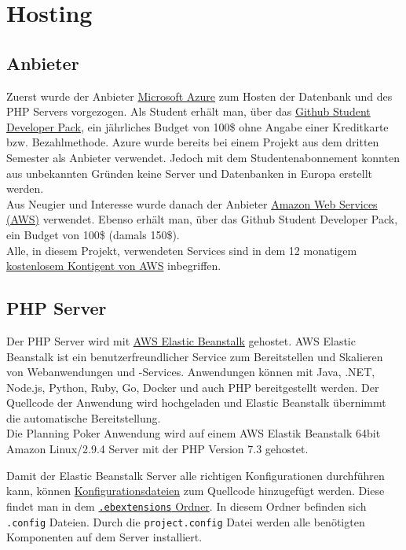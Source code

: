 \chapter{Hosting}\label{ch:hosting}

\section{Anbieter}
Zuerst wurde der Anbieter \href{https://azure.microsoft.com/de-de/}{Microsoft Azure} zum Hosten der Datenbank und des PHP Servers vorgezogen. Als Student erhält man, über das \href{https://education.github.com/pack}{Github Student Developer Pack}, ein jährliches Budget von 100\$ ohne Angabe einer Kreditkarte bzw. Bezahlmethode. Azure wurde bereits bei einem Projekt aus dem dritten Semester als Anbieter verwendet. Jedoch mit dem Studentenabonnement konnten aus unbekannten Gründen keine Server und Datenbanken in Europa erstellt werden.\\
Aus Neugier und Interesse wurde danach der Anbieter \href{https://aws.amazon.com/de/}{Amazon Web Services (AWS)} verwendet. Ebenso erhält man, über das Github Student Developer Pack, ein Budget von 100\$ (damals 150\$).\\
Alle, in diesem Projekt, verwendeten Services sind in dem 12 monatigem \href{https://aws.amazon.com/de/free/}{kostenlosem Kontigent von AWS} inbegriffen.

\section{PHP Server}
Der PHP Server wird mit \href{https://aws.amazon.com/de/elasticbeanstalk/}{AWS Elastic Beanstalk} gehostet. \glqq AWS Elastic Beanstalk ist ein benutzerfreundlicher Service zum Bereitstellen und Skalieren von Webanwendungen und -Services\grqq. Anwendungen können mit Java, .NET, Node.js, Python, Ruby, Go, Docker und auch PHP bereitgestellt werden. Der Quellcode der Anwendung wird hochgeladen und Elastic Beanstalk übernimmt die automatische Bereitstellung. \cite{AWSEB}\\
Die Planning Poker Anwendung wird auf einem AWS Elastik Beanstalk 64bit Amazon Linux/2.9.4 Server mit der PHP Version 7.3 gehostet.

Damit der Elastic Beanstalk Server alle richtigen Konfigurationen durchführen kann, können \href{https://docs.aws.amazon.com/de_de/elasticbeanstalk/latest/dg/ebextensions.html}{Konfigurationsdateien} zum Quellcode hinzugefügt werden. Diese findet man in dem \href{https://github.com/Drinkler/Planning-Poker/tree/master/.ebextensions}{\lstinline{.ebextensions} Ordner}. In diesem Ordner befinden sich \lstinline{.config} Dateien. Durch die \lstinline{project.config} Datei werden alle benötigten Komponenten auf dem Server installiert.
